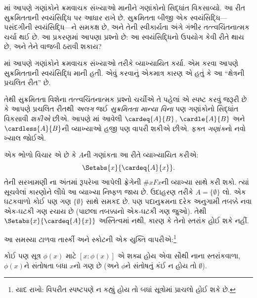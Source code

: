 
\label{guunit:OLP-0593}


માં આપણે
ગણાંકોને ક્રમવાચક સંખ્યાઓ માનીને ગણાંકોનો સિદ્ધાંત
વિકસાવ્યો. આ રીત સુક્રમિતતાની સ્વયંસિદ્ધિ પર આધાર
રાખે છે. સુક્રમિતતા બીજી એક સ્વયંસિદ્ધિ---પસંદગીની
સ્વયંસિદ્ધિ---ને સમકક્ષ છે, અને તેની સ્વીકાર્યતા અંગે
ગંભીર તત્ત્વચિંતનાત્મક ચર્ચા થઈ છે. આ પ્રકરણમાં આપણા
પ્રશ્નો છે: આ સ્વયંસિદ્ધિનો ઉપયોગ કેવી રીતે થાય છે,
અને તેને વાજબી ઠરાવી શકાય?
\endgroup

\begingroup
\makeatletter{}\makeatother

\label{guunit:OLP-0594}


માં આપણે
ગણાંકોને ક્રમવાચક સંખ્યાઓ તરીકે વ્યાખ્યાયિત કર્યા.
એમ કરવા આપણે સુક્રમિતતાની સ્વયંસિદ્ધિ માની હતી.
એવું કરવાનું એકમાત્ર કારણ એ હતું કે આ
``ક્ષેત્રની પ્રચલિત રીત'' છે.

તેથી સુક્રમિતતા વિશેના તત્ત્વચિંતનાત્મક પ્રશ્નો
ચર્ચીએ તે પહેલાં એ સ્પષ્ટ કરવું જરૂરી છે કે આપણે
પ્રચલિત રીતથી \emph{અલગ} જઈ \emph{સુક્રમિતતા
માન્યા વિના} પણ ગણાંકોનો સિદ્ધાંત વિકસાવી
\emph{શકીએ} છીએ. આપણે
માં આવેલી
$\cardeq{A}{B}$, $\cardle{A}{B}$ અને $\cardless{A}{B}$ની
વ્યાખ્યાઓ હજી પણ વાપરી શકીએ છીએ. ફક્ત
\emph{ગણાંક}નો નવો ખ્યાલ જોઈએ.

એક ભોળો વિચાર એ છે કે $A$ની ગણાંકતા આ રીતે
વ્યાખ્યાયિત કરીએ:
\[
	\Setabs{x}{\cardeq{A}{x}}.
\]
તેની સરખામણી ના
અંતમાં રૂપરેખા આપેલી ફ્રેગેની $\# x Fx$ની
વ્યાખ્યા સાથે કરી શકો. ત્યાં સૂચવેલાં કારણોને
લીધે આ વ્યાખ્યા નિષ્ફળ જાય છે. ઉદાહરણ તરીકે $A=\{\emptyset\}$ લો. એક ઘટકવાળો
કોઈ પણ ગણ $\{\emptyset\}$ સાથે સમકદ છે.
પણ પદાનુક્રમના દરેક અનુગામી તબક્કે નવા
એક-ઘટકી ગણ રચાય છે (પાછલા તબક્કાનો
એક-ઘટકી ગણ જુઓ). તેથી
$\Setabs{x}{\cardeq{A}{x}}$ અસ્તિત્વમાં નથી,
કારણ કે તેનો સ્તરાંક હોઈ શકે નહીં.

આ સમસ્યા ટાળવા તાર્સ્કી અને સ્કોટની એક
યુક્તિ વાપરીએ:\footnote{યાદ રાખો: વિપરીત
સ્પષ્ટપણે ન કહ્યું હોય તો બધાં સૂત્રોમાં
પ્રાચલો હોઈ શકે છે.}

\begin{defn}[તાર્સ્કી--સ્કોટ]
કોઈ પણ સૂત્ર $\phi(x)$ માટે $[ x : \phi(x)] $
એ શક્ય હોય એવા સૌથી નાના સ્તરાંકવાળા,
$\phi(x)$ને સંતોષતા બધા $x$નો ગણ છે
(અને $\phi$ને સંતોષતું કંઈ ન હોય તો $\emptyset$).
\end{defn}


